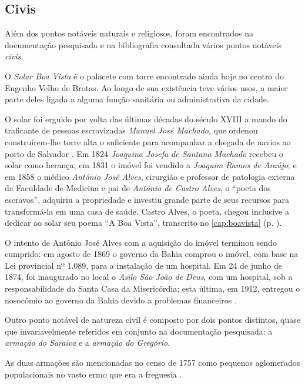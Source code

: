 \subsection{Civis}\label{subsec:pontciv}

Além dos pontos notáveis naturais e religiosos, foram encontrados na documentação pesquisada e na bibliografia consultada vários pontos notáveis \textit{civis}.

O \textit{Solar Boa Vista} é o palacete com torre encontrado ainda hoje no centro do Engenho Velho de Brotas. Ao longo de sua existência teve vários usos, a maior parte deles ligada a alguma função sanitária ou administrativa da cidade.

O solar foi erguido por volta das últimas décadas do século XVIII a mando do traficante de pessoas escravizadas \textit{Manuel José Machado}, que ordenou construírem-lhe torre alta o suficiente para acompanhar a chegada de navios ao porto de Salvador \cite[p.~127]{mattos_panorama_2011}. Em 1824 \textit{Joaquina Josefa de Santana Machado} recebeu o solar como herança; em 1831 o imóvel foi vendido a \textit{Joaquim Ramos de Araújo}; e em 1858 o médico \textit{Antônio José Alves}, cirurgião e professor de patologia externa da Faculdade de Medicina e pai de \textit{Antônio de Castro Alves}, o ``poeta dos escravos'', adquiriu a propriedade e investiu grande parte de seus recursos para transformá-la em uma casa de saúde. Castro Alves, o poeta, chegou inclusive a dedicar ao solar seu poema ``A Boa Vista'', transcrito no \autoref{cap:boavista} (p. \pageref{cap:boavista}).

O intento de Antônio José Alves com a aquisição do imóvel terminou sendo cumprido: em agosto de 1869 o governo da Bahia comprou o imóvel, com base na Lei provincial nº 1.089, para a instalação de um hospital. Em 24 de junho de 1874, foi inaugurado no local o \textit{Asilo São João de Deus}, com um hospital, sob a responsabilidade da Santa Casa da Misericórdia; esta última, em 1912, entregou o nosocômio ao governo da Bahia devido a problemas financeiros \cite{jacobina_asylo_2001}.

Outro ponto notável de natureza civil é composto por dois pontos distintos, quase que invariavelmente referidos em conjunto na documentação pesquisada: a \textit{armação do Saraiva} e a \textit{armação do Gregório}.

As duas armações são mencionadas no censo de 1757 como pequenos aglomerados populacionais no vasto ermo que era a freguesia \cite[p.~183]{castralmeida_ultramar_1908}.

